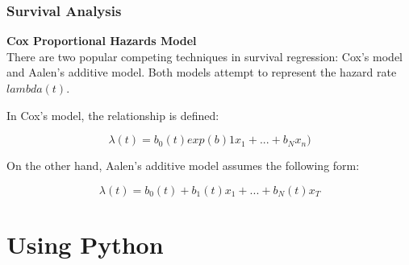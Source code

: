 \documentclass[]{beamer}
\begin{document}
	\begin{frame}
		\frametitle{Survival Analysis}
		\noindent \textbf{Cox Proportional Hazards Model}\\
		There are two popular competing techniques in survival regression: Cox’s model and Aalen’s additive model. Both models attempt to represent the hazard rate $lambda(t)$.
		
		In Cox’s model, the relationship is defined:
		
		\[\lambda(t)=b_0(t)exp(b)1x_1+...+b_Nx_n)\]
		
		On the other hand, Aalen’s additive model assumes the following form:
		
		\[\lambda(t)=b_0(t)+b_1(t)x_1+...+b_N(t)x_T\]
	\end{frame}



	\section{Using Python}
	
\end{document}
